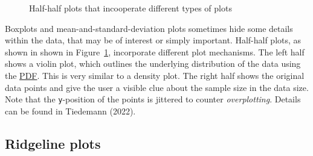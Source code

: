 \documentclass[
  a4paper,
]{scrbook}
\begin{document}
\begin{figure}[ht]


\caption{\label{fig-groups-halves}Half-half plots that incooperate
different types of plots}

\end{figure}%

Boxplots and mean-and-standard-deviation plots sometimes hide some
details within the data, that may be of interest or simply important.
Half-half plots, as shown in shown in Figure~\ref{fig-groups-halves},
incorporate different plot mechanisms. The left half shows a violin
plot, which outlines the underlying distribution of the data using the
\hyperref[acronyms_PDF]{PDF}. This is very similar to a density plot.
The right half shows the original data points and give the user a
visible clue about the sample size in the data size. Note that the
\texttt{y}-position of the points is jittered to counter
\emph{overplotting}. Details can be found in Tiedemann (2022).

\subsection{Ridgeline plots}\label{ridgeline-plots}
\end{document}
